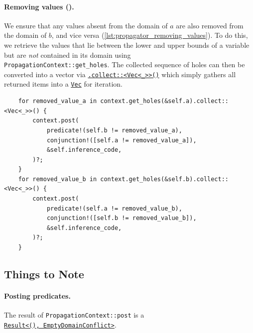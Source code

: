 \documentclass{article}
\begin{document}
\paragraph{Removing values ().}
    We ensure that any values absent from the domain of $a$ are also removed from
    the domain of $b$, and vice versa (\autoref{lst:propagator_removing_values}).
    To do this, we retrieve the values that lie
    between the lower and upper bounds of a variable but are \emph{not} contained
    in its domain using \\ \texttt{PropagationContext::get_holes}.
    The collected sequence of holes can then be converted into a vector via \href{https://doc.rust-lang.org/std/iter/trait.Iterator.html#method.collect}{\texttt{.collect::<Vec<_>>()}} which simply gathers all returned items into a \href{https://doc.rust-lang.org/std/vec/struct.Vec.html}{\texttt{Vec}} for iteration.

    \begin{listing}[H]
        \begin{verbatim}
    for removed_value_a in context.get_holes(&self.a).collect::<Vec<_>>() {
        context.post(
            predicate!(self.b != removed_value_a), 
            conjunction!([self.a != removed_value_a]), 
            &self.inference_code,
        )?;
    }
    for removed_value_b in context.get_holes(&self.b).collect::<Vec<_>>() {
        context.post(
            predicate!(self.a != removed_value_b),
            conjunction!([self.b != removed_value_b]),
            &self.inference_code,
        )?;
    }
        \end{verbatim}
        \caption{Removing values}
        \label{lst:propagator_removing_values}
    \end{listing}
    
\subsection*{Things to Note}
    \paragraph{Posting predicates.} 
        The result of \texttt{PropagationContext::post} is a \\ \href{https://doc.rust-lang.org/std/result/}{\texttt{Result<(), EmptyDomainConflict>}}. 
    
\end{document}
